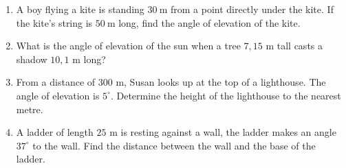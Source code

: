 \begin{exercises}{}
{
\begin{enumerate}[noitemsep, label=\textbf{\arabic*}. ] 
\item A boy flying a kite is standing $30~$m from a point directly under the kite. If the kite's string is $50~$m long, find the angle of elevation of the kite.
\item What is the angle of elevation of the sun when a tree $7,15$ m tall casts a shadow $10,1$ m long?
\item From a distance of $300$ m, Susan looks up at the top of a lighthouse. The angle of elevation is $5^{\circ}$. Determine the height of the lighthouse to the nearest metre.
\item A ladder of length $25$ m is resting against a wall, the ladder makes an angle $37^{\circ}$ to the wall. Find the distance between the wall and the base of the ladder. 
\end{enumerate}

}
\end{exercises} 


